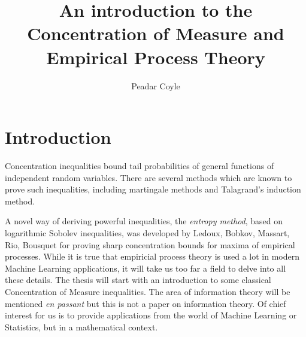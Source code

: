 \documentclass{article}
\title{An introduction to the Concentration of Measure and Empirical Process Theory}
\author{Peadar Coyle}
\theoremstyle{plain}
\begin{document}
\renewcommand{\baselinestretch}{1.5}

\maketitle
\section{Introduction}
Concentration inequalities bound tail probabilities of general functions of independent
   random variables. There are several methods which are known to prove such inequalities,
   including martingale methods and Talagrand's induction method. 
      
 A novel way of deriving powerful inequalities, the \textit{entropy method}, based on
 logarithmic Sobolev inequalities, was developed by Ledoux, Bobkov, Massart, Rio,
Bousquet for proving sharp concentration bounds for maxima of empirical processes.
While it is true that empiricial process theory is used a 
lot in modern Machine Learning applications, it will take us too far a field to delve into all these details.
The thesis will start with an introduction to some classical Concentration of Measure inequalities. The area of
information theory will be mentioned \textit{en passant} but this is not a paper on information theory. 
Of chief interest for us is to provide applications from the world of Machine Learning or Statistics, but in a
mathematical context. 
\end{document}
